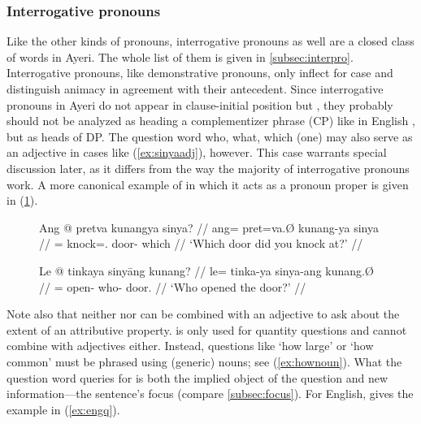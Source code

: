 
\subsubsection{Interrogative pronouns}

Like the other kinds of pronouns, interrogative pronouns as well are a closed
class of words in Ayeri. The whole list of them is given in
\autoref{subsec:interpro}. Interrogative pronouns, like demonstrative pronouns,
only inflect for case and distinguish animacy in agreement with their
antecedent. Since interrogative pronouns in Ayeri do not appear in
clause-initial position but , they probably should not be analyzed
as heading a complementizer phrase (CP) like in English \parencites[359--369]{carnie2013}[405--408]
{dalrymple2001}, but as heads of DP. The question word  {who,
what, which (one)} may also serve as an adjective in cases like
(\ref{ex:sinyaadj}), however. This case warrants special discussion later, as
it differs from the way the majority of interrogative pronouns work. A more
canonical example of  in which it acts as a pronoun proper is
given in (\ref{ex:sinyapro}).

\begin{figure}
\pex
\a\label{ex:sinyaadj}%
\begingl
	\gla Ang @ pretva kunangya sinya? //
	\glb ang= pret=va.Ø kunang-ya sinya //
	\glc \AgtT{}= knock=\Second{}.\Top{} door-\Loc{} which //
	\glft `Which door did you knock at?' //
\endgl

\a\label{ex:sinyapro}%
\begingl
	\gla Le @ tinkaya sinyāng kunang? //
	\glb le= tinka-ya sinya-ang kunang.Ø //
	\glc \PatTI{}= open-\TsgM{} who-\Aarg{} door.\Top{} //
	\glft `Who opened the door?' //
\endgl
\xe
\end{figure}

Note also that neither  nor
 can be combined with an adjective to
ask about the extent of an attributive property.  is only used for quantity questions and cannot combine with
adjectives either. Instead, questions like `how large' or `how common' must be
phrased using (generic) nouns; see (\ref{ex:hownoun}). What the question word
queries for is both the implied object of the question and new
information---the sentence's focus (compare
\autoref{subsec:focus}). For English, \citet{dalrymple2001} gives the example
in (\ref{ex:engq}).

